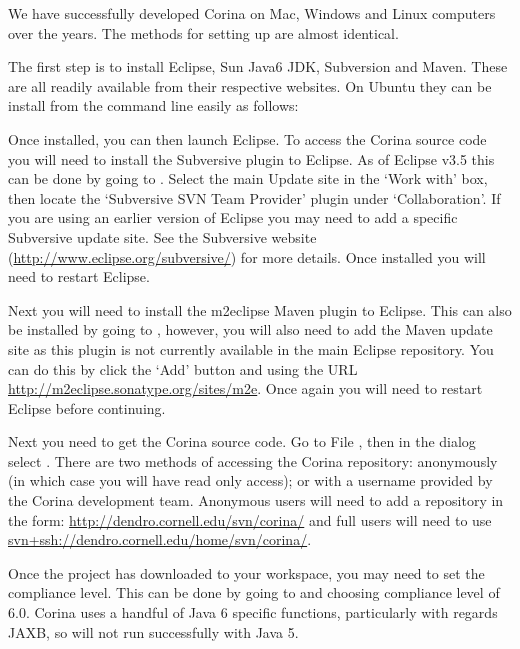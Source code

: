 We have successfully developed Corina on Mac, Windows and Linux computers over the years.  The methods for setting up are almost identical.  

The first step is to install Eclipse, Sun Java6 JDK, Subversion and Maven.  These are all readily available from their respective websites.  On Ubuntu they can be install from the command line easily as follows:


Once installed, you can then launch Eclipse.  To access the Corina source code you will need to install the Subversive plugin to Eclipse.  As of Eclipse v3.5 this can be done by going to .  Select the main Update site in the `Work with' box, then locate the `Subversive SVN Team Provider' plugin under `Collaboration'.  If you are using an earlier version of Eclipse you may need to add a specific Subversive update site.  See the Subversive website (\url{http://www.eclipse.org/subversive/}) for more details.  Once installed you will need to restart Eclipse.

Next you will need to install the m2eclipse Maven plugin to Eclipse.  This can also be installed by going to , however, you will also need to add the Maven update site as this plugin is not currently available in the main Eclipse repository.  You can do this by click the `Add' button and using the URL \url{http://m2eclipse.sonatype.org/sites/m2e}.  Once again you will need to restart Eclipse before continuing.

Next you need to get the Corina source code.  Go to File , then in the dialog select .  There are two methods of accessing the Corina repository: anonymously (in which case you will have read only access); or with a username provided by the Corina development team.  Anonymous users will need to add a repository in the form: \url{http://dendro.cornell.edu/svn/corina/} and full users will need to use \url{svn+ssh://dendro.cornell.edu/home/svn/corina/}.

Once the project has downloaded to your workspace, you may need to set the compliance level.  This can be done by going to  and choosing compliance level of 6.0.  Corina uses a handful of Java 6 specific functions, particularly with regards JAXB, so will not run successfully with Java 5.  

